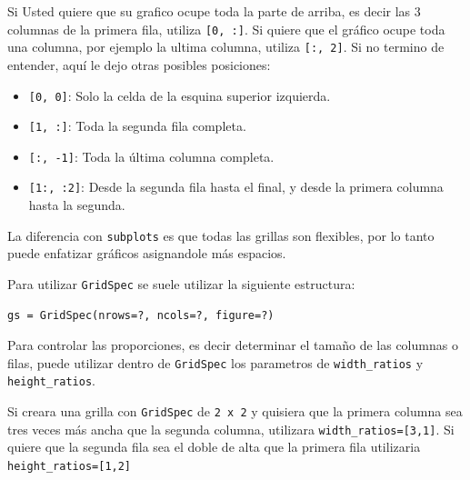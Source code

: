 Si Usted quiere que su grafico ocupe toda la parte de arriba, es decir las 3 columnas de la primera fila, utiliza \texttt{[0, :]}. Si quiere que el gráfico ocupe toda una columna, por ejemplo la ultima columna, utiliza \texttt{[:, 2]}. Si no termino de entender, aquí le dejo otras posibles posiciones:
\begin{itemize}
    \item \texttt{[0, 0]}: Solo la celda de la esquina superior izquierda.
    \item \texttt{[1, :]}: Toda la segunda fila completa.
    \item \texttt{[:, -1]}: Toda la última columna completa.
    \item \texttt{[1:, :2]}: Desde la segunda fila hasta el final, y desde la primera columna hasta la segunda.
\end{itemize}

La diferencia con \texttt{subplots} es que todas las grillas son flexibles, por lo tanto puede enfatizar gráficos asignandole más espacios.

Para utilizar \texttt{GridSpec} se suele utilizar la siguiente estructura:
\begin{verbatim}
gs = GridSpec(nrows=?, ncols=?, figure=?)
\end{verbatim}

Para controlar las proporciones, es decir determinar el tamaño de las columnas o filas, puede utilizar dentro de \texttt{GridSpec} los parametros de \texttt{width\_ratios} y \texttt{height\_ratios}. 
\begin{ejemplo}
    Si creara una grilla con \texttt{GridSpec} de \texttt{2 x 2} y quisiera que la primera columna sea tres veces más ancha que la segunda columna, utilizara \texttt{width\_ratios=[3,1]}. Si quiere que la segunda fila sea el doble de alta que la primera fila utilizaria \texttt{height\_ratios=[1,2]}
\end{ejemplo}

